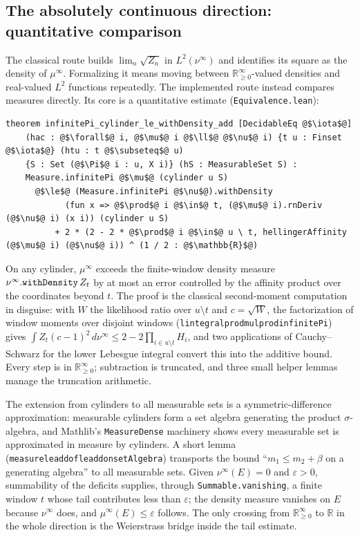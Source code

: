 \documentclass[a4paper,UKenglish,autoref,thm-restate]{lipics-v2021}
\newcommand{\ennreal}{\ensuremath{\mathbb{R}_{\ge 0}^{\infty}}}
\newcommand{\leanid}[1]{{\def\_{\textunderscore\allowbreak}\texttt{#1}}}
\begin{document}
\subsection{The absolutely continuous direction: quantitative comparison}
\label{sec:ac-route}

The classical route builds $\lim_n \sqrt{Z_n}$ in $L^2(\nu^\infty)$ and
identifies its square as the density of $\mu^\infty$. Formalizing it means
moving between \ennreal-valued densities and real-valued $L^2$ functions
repeatedly. The implemented route instead compares measures directly. Its
core is a quantitative estimate (\texttt{Equivalence.lean}):
\begin{lstlisting}[basicstyle=\footnotesize\ttfamily]
theorem infinitePi_cylinder_le_withDensity_add [DecidableEq @$\iota$@]
    (hac : @$\forall$@ i, @$\mu$@ i @$\ll$@ @$\nu$@ i) {t u : Finset @$\iota$@} (htu : t @$\subseteq$@ u)
    {S : Set (@$\Pi$@ i : u, X i)} (hS : MeasurableSet S) :
    Measure.infinitePi @$\mu$@ (cylinder u S)
      @$\le$@ (Measure.infinitePi @$\nu$@).withDensity
            (fun x => @$\prod$@ i @$\in$@ t, (@$\mu$@ i).rnDeriv (@$\nu$@ i) (x i)) (cylinder u S)
          + 2 * (2 - 2 * @$\prod$@ i @$\in$@ u \ t, hellingerAffinity (@$\mu$@ i) (@$\nu$@ i)) ^ (1 / 2 : @$\mathbb{R}$@)
\end{lstlisting}
On any cylinder, $\mu^\infty$ exceeds the finite-window density measure
$\nu^\infty.\leanid{withDensity}\,Z_t$ by at most an error controlled by the
affinity product over the coordinates beyond $t$. The proof is the classical
second-moment computation in disguise: with $W$ the likelihood ratio over
$u \setminus t$ and $c = \sqrt{W}$, the factorization of window moments over
disjoint windows (\leanid{lintegral\_prod\_mul\_prod\_infinitePi}) gives
$\int Z_t (c-1)^2 \, d\nu^\infty \le 2 - 2\prod_{i \in u \setminus t} H_i$,
and two applications of Cauchy--Schwarz for the lower Lebesgue integral
convert this into the additive bound. Every step is in \ennreal; subtraction
is truncated, and three small helper lemmas manage the truncation
arithmetic.

The extension from cylinders to all measurable sets is a symmetric-difference
approximation: measurable cylinders form a set algebra generating the product
$\sigma$-algebra, and Mathlib's \leanid{MeasureDense} machinery shows every
measurable set is approximated in measure by cylinders. A short lemma
(\leanid{measure\_le\_add\_of\_le\_add\_on\_setAlgebra}) transports the bound
``$m_1 \le m_2 + \beta$ on a generating algebra'' to all measurable sets.
Given $\nu^\infty(E) = 0$ and $\varepsilon > 0$, summability of the deficits
supplies, through \leanid{Summable.vanishing}, a finite window $t$ whose tail
contributes less than $\varepsilon$; the density measure vanishes on $E$
because $\nu^\infty$ does, and $\mu^\infty(E) \le \varepsilon$ follows. The
only crossing from \ennreal{} to $\mathbb{R}$ in the whole direction is the
Weierstrass bridge inside the tail estimate.
\end{document}
